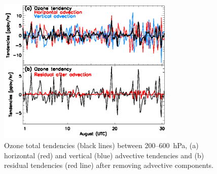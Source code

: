  \begin{figure}
 \noindent\includegraphics[width=20pc]{figures/tendency_res.eps}
 \caption{Ozone total tendencies (black lines) between 200--600~hPa, (a)
horizontal (red) and vertical (blue) advective tendencies and (b)
residual tendencies (red line) after removing advective components.}
 \label{fig:tend_res}
 \end{figure}

